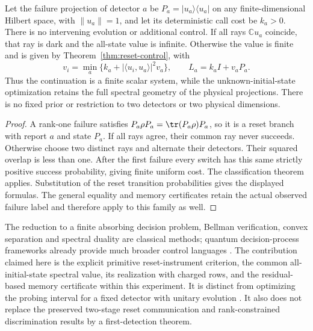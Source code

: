 \begin{corollary}\label{cor:rank-one-family}
Let the failure projection of detector $a$ be $P_a=|u_a\rangle\langle u_a|$ on any finite-dimensional Hilbert space, with $\|u_a\|=1$, and let its deterministic call cost be $k_a>0$. There is no intervening evolution or additional control. If all rays $\mathbb C u_a$ coincide, that ray is dark and the all-state value is infinite. Otherwise the value is finite and is given by Theorem~\ref{thm:reset-control}, with
\[
 v_i=\min_a\{k_a+|\langle u_i,u_a\rangle|^2v_a\},
 \qquad L_a=k_aI+v_aP_a.
\]
Thus the continuation is a finite scalar system, while the unknown-initial-state optimization retains the full spectral geometry of the physical projections. There is no fixed prior or restriction to two detectors or two physical dimensions.
\end{corollary}
\begin{proof}
A rank-one failure satisfies $P_a\rho P_a=\tr(P_a\rho)P_a$, so it is a reset branch with report $a$ and state $P_a$. If all rays agree, their common ray never succeeds. Otherwise choose two distinct rays and alternate their detectors. Their squared overlap is less than one. After the first failure every switch has this same strictly positive success probability, giving finite uniform cost. The classification theorem applies. Substitution of the reset transition probabilities gives the displayed formulas. The general equality and memory certificates retain the actual observed failure label and therefore apply to this family as well.
\end{proof}

The reduction to a finite absorbing decision problem, Bellman verification, convex separation and spectral duality are classical methods; quantum decision-process frameworks already provide much broader control languages \cite{Barry14,Ying18,Saldi25}. The contribution claimed here is the explicit primitive reset-instrument criterion, the common all-initial-state spectral value, its realization with charged rows, and the residual-based memory certificate within this experiment. It is distinct from optimizing the probing interval for a fixed detector with unitary evolution \cite{Kessler21,DelVecchio26}. It also does not replace the preserved two-stage reset communication and rank-constrained discrimination results by a first-detection theorem.
